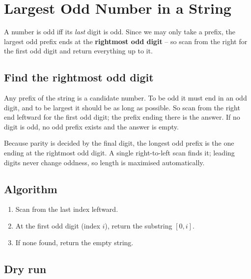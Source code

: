 \section{Largest Odd Number in a String}
\label{sec:str-largest-odd}


\begin{patternbox}
A number is odd iff its \emph{last} digit is odd. Since we may only take a
prefix, the largest odd prefix ends at the \textbf{rightmost odd digit} --
so scan from the right for the first odd digit and return everything up to
it.
\end{patternbox}

\subsection*{Find the rightmost odd digit}

Any prefix of the string is a candidate number. To be odd it must end in an
odd digit, and to be largest it should be as long as possible. So scan from
the right end leftward for the first odd digit; the prefix ending there is
the answer. If no digit is odd, no odd prefix exists and the answer is
empty.

\begin{ideabox}
Because parity is decided by the final digit, the longest odd prefix is the
one ending at the rightmost odd digit. A single right-to-left scan finds it;
leading digits never change oddness, so length is maximised automatically.
\end{ideabox}

\subsection*{Algorithm}

\begin{enumerate}
  \item Scan from the last index leftward.
  \item At the first odd digit (index $i$), return the substring
        $[0,i]$.
  \item If none found, return the empty string.
\end{enumerate}

\subsection*{Dry run}

